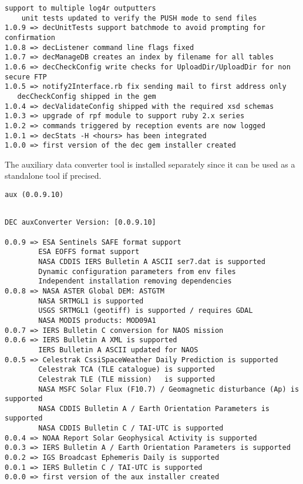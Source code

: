 \documentclass[dec_sum_main.tex]{subfiles}
\begin{document}
\begin{Verbatim}[tabsize=4]
    support to multiple log4r outputters
    unit tests updated to verify the PUSH mode to send files
1.0.9 => decUnitTests support batchmode to avoid prompting for confirmation
1.0.8 => decListener command line flags fixed
1.0.7 => decManageDB creates an index by filename for all tables
1.0.6 => decCheckConfig write checks for UploadDir/UploadDir for non secure FTP
1.0.5 => notify2Interface.rb fix sending mail to first address only
   decCheckConfig shipped in the gem
1.0.4 => decValidateConfig shipped with the required xsd schemas
1.0.3 => upgrade of rpf module to support ruby 2.x series
1.0.2 => commands triggered by reception events are now logged
1.0.1 => decStats -H <hours> has been integrated
1.0.0 => first version of the dec gem installer created
\end{Verbatim}

\par
\noindent 
The auxiliary data converter tool is installed separately since it can be used as a standalone tool if precised. \newline


\begin{Verbatim}[tabsize=4]
    aux (0.0.9.10)
\end{Verbatim}


\begin{Verbatim}[tabsize=4]
    
DEC auxConverter Version: [0.0.9.10]

0.0.9 => ESA Sentinels SAFE format support
        ESA EOFFS format support
        NASA CDDIS IERS Bulletin A ASCII ser7.dat is supported
        Dynamic configuration parameters from env files
        Independent installation removing dependencies
0.0.8 => NASA ASTER Global DEM: ASTGTM
        NASA SRTMGL1 is supported
        USGS SRTMGL1 (geotiff) is supported / requires GDAL
        NASA MODIS products: MOD09A1
0.0.7 => IERS Bulletin C conversion for NAOS mission
0.0.6 => IERS Bulletin A XML is supported
        IERS Bulletin A ASCII updated for NAOS
0.0.5 => Celestrak CssiSpaceWeather Daily Prediction is supported
        Celestrak TCA (TLE catalogue) is supported
        Celestrak TLE (TLE mission)   is supported
        NASA MSFC Solar Flux (F10.7) / Geomagnetic disturbance (Ap) is supported
        NASA CDDIS Bulletin A / Earth Orientation Parameters is supported
        NASA CDDIS Bulletin C / TAI-UTC is supported
0.0.4 => NOAA Report Solar Geophysical Activity is supported
0.0.3 => IERS Bulletin A / Earth Orientation Parameters is supported
0.0.2 => IGS Broadcast Ephemeris Daily is supported
0.0.1 => IERS Bulletin C / TAI-UTC is supported
0.0.0 => first version of the aux installer created
\end{Verbatim}
\end{document}
